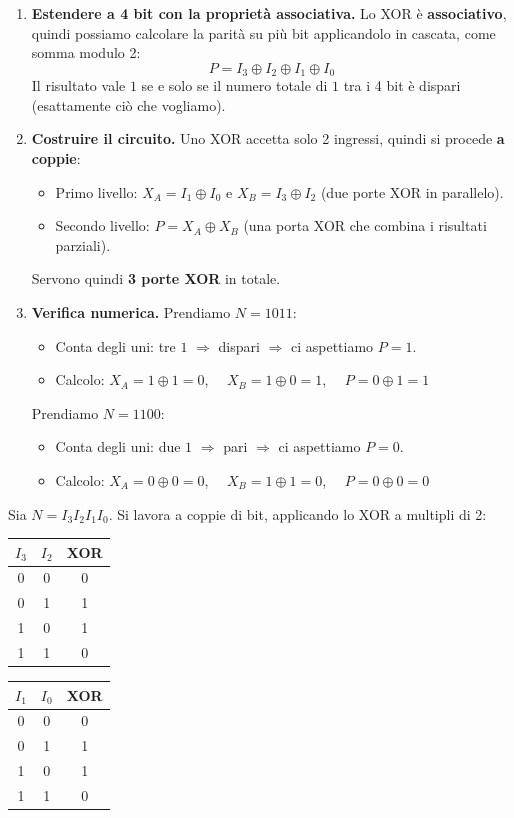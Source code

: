 \begin{enumerate}[leftmargin=1.5em]
    \item \textbf{Estendere a 4 bit con la proprietà associativa.} Lo XOR è \textbf{associativo}, quindi possiamo calcolare la parità su più bit applicandolo in cascata, come somma modulo 2:
    \[
        P = I_3 \oplus I_2 \oplus I_1 \oplus I_0
    \]
    Il risultato vale $1$ se e solo se il numero totale di $1$ tra i 4 bit è dispari (esattamente ciò che vogliamo).

    \item \textbf{Costruire il circuito.} Uno XOR accetta solo 2 ingressi, quindi si procede \textbf{a coppie}:
    \begin{itemize}
        \item Primo livello: $X_A = I_1 \oplus I_0$ e $X_B = I_3 \oplus I_2$ (due porte XOR in parallelo).
        \item Secondo livello: $P = X_A \oplus X_B$ (una porta XOR che combina i risultati parziali).
    \end{itemize}
    Servono quindi \textbf{3 porte XOR} in totale.

    \item \textbf{Verifica numerica.} Prendiamo $N = 1011$:
    \begin{itemize}
        \item Conta degli uni: tre $1$ $\Rightarrow$ dispari $\Rightarrow$ ci aspettiamo $P = 1$.
        \item Calcolo: $X_A = 1 \oplus 1 = 0$, $\quad X_B = 1 \oplus 0 = 1$, $\quad P = 0 \oplus 1 = 1$ \checkmark
    \end{itemize}
    Prendiamo $N = 1100$:
    \begin{itemize}
        \item Conta degli uni: due $1$ $\Rightarrow$ pari $\Rightarrow$ ci aspettiamo $P = 0$.
        \item Calcolo: $X_A = 0 \oplus 0 = 0$, $\quad X_B = 1 \oplus 1 = 0$, $\quad P = 0 \oplus 0 = 0$ \checkmark
    \end{itemize}
\end{enumerate}

\medskip
\noindent Sia $N = I_3 I_2 I_1 I_0$. Si lavora a coppie di bit, applicando lo XOR a multipli di 2:

\begin{center}
\begin{tabular}{cc|c}
\toprule
$I_3$ & $I_2$ & XOR\\
\midrule
0&0&0\\
0&1&1\\
1&0&1\\
1&1&0\\
\bottomrule
\end{tabular}
\qquad
\begin{tabular}{cc|c}
\toprule
$I_1$ & $I_0$ & XOR\\
\midrule
0&0&0\\
0&1&1\\
1&0&1\\
1&1&0\\
\bottomrule
\end{tabular}
\end{center}

